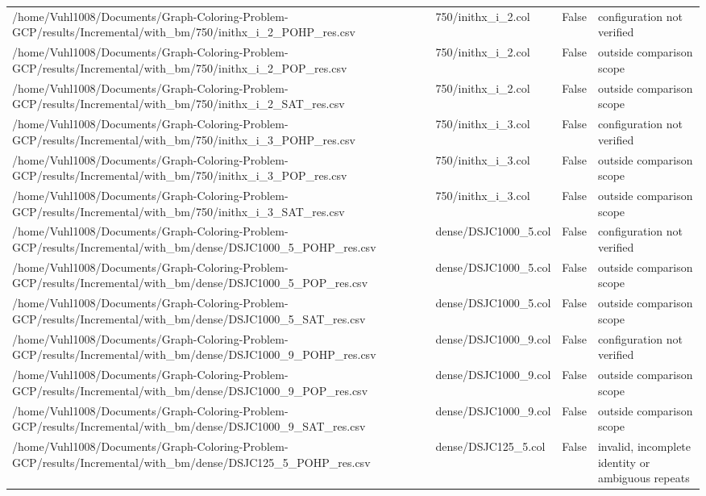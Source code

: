 \begin{table}[htbp]
\begin{tabular}{llll}
/home/Vuhl1008/Documents/Graph-Coloring-Problem-GCP/results/Incremental/with\_bm/750/inithx\_i\_2\_POHP\_res.csv & 750/inithx\_i\_2.col & False & configuration not verified \\
/home/Vuhl1008/Documents/Graph-Coloring-Problem-GCP/results/Incremental/with\_bm/750/inithx\_i\_2\_POP\_res.csv & 750/inithx\_i\_2.col & False & outside comparison scope \\
/home/Vuhl1008/Documents/Graph-Coloring-Problem-GCP/results/Incremental/with\_bm/750/inithx\_i\_2\_SAT\_res.csv & 750/inithx\_i\_2.col & False & outside comparison scope \\
/home/Vuhl1008/Documents/Graph-Coloring-Problem-GCP/results/Incremental/with\_bm/750/inithx\_i\_3\_POHP\_res.csv & 750/inithx\_i\_3.col & False & configuration not verified \\
/home/Vuhl1008/Documents/Graph-Coloring-Problem-GCP/results/Incremental/with\_bm/750/inithx\_i\_3\_POP\_res.csv & 750/inithx\_i\_3.col & False & outside comparison scope \\
/home/Vuhl1008/Documents/Graph-Coloring-Problem-GCP/results/Incremental/with\_bm/750/inithx\_i\_3\_SAT\_res.csv & 750/inithx\_i\_3.col & False & outside comparison scope \\
/home/Vuhl1008/Documents/Graph-Coloring-Problem-GCP/results/Incremental/with\_bm/dense/DSJC1000\_5\_POHP\_res.csv & dense/DSJC1000\_5.col & False & configuration not verified \\
/home/Vuhl1008/Documents/Graph-Coloring-Problem-GCP/results/Incremental/with\_bm/dense/DSJC1000\_5\_POP\_res.csv & dense/DSJC1000\_5.col & False & outside comparison scope \\
/home/Vuhl1008/Documents/Graph-Coloring-Problem-GCP/results/Incremental/with\_bm/dense/DSJC1000\_5\_SAT\_res.csv & dense/DSJC1000\_5.col & False & outside comparison scope \\
/home/Vuhl1008/Documents/Graph-Coloring-Problem-GCP/results/Incremental/with\_bm/dense/DSJC1000\_9\_POHP\_res.csv & dense/DSJC1000\_9.col & False & configuration not verified \\
/home/Vuhl1008/Documents/Graph-Coloring-Problem-GCP/results/Incremental/with\_bm/dense/DSJC1000\_9\_POP\_res.csv & dense/DSJC1000\_9.col & False & outside comparison scope \\
/home/Vuhl1008/Documents/Graph-Coloring-Problem-GCP/results/Incremental/with\_bm/dense/DSJC1000\_9\_SAT\_res.csv & dense/DSJC1000\_9.col & False & outside comparison scope \\
/home/Vuhl1008/Documents/Graph-Coloring-Problem-GCP/results/Incremental/with\_bm/dense/DSJC125\_5\_POHP\_res.csv & dense/DSJC125\_5.col & False & invalid, incomplete identity or ambiguous repeats \\

\end{tabular}
\end{table}
